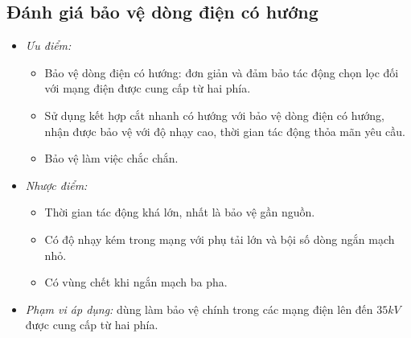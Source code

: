 \documentclass[12pt,a4paper]{article}
\begin{document}
\subsection{Đánh giá bảo vệ dòng điện có hướng}
	\begin{itemize}	
		\item \emph{Ưu điểm:}
		\begin{itemize}
			\item Bảo vệ dòng điện có hướng: đơn giản và đảm bảo tác động chọn lọc đối với mạng điện được cung cấp từ hai phía.
		
			\item Sử dụng kết hợp cắt nhanh có hướng với bảo vệ dòng điện có hướng, nhận được bảo vệ với độ nhạy cao, thời gian tác động thỏa mãn yêu cầu.
		
			\item Bảo vệ làm việc chắc chắn.
		\end{itemize}
		
		\item \emph{Nhược điểm:}
			\begin{itemize}
				\item Thời gian tác động khá lớn, nhất là bảo vệ gần nguồn.
				
				\item Có độ nhạy kém trong mạng với phụ tải lớn và bội số dòng ngắn mạch nhỏ.
				
				\item Có vùng chết khi ngắn mạch ba pha.
			\end{itemize}
		
		\item \emph{Phạm vi áp dụng:} dùng làm bảo vệ chính trong các mạng điện lên đến $35 \unit{kV}$ được cung cấp từ hai phía.
	\end{itemize}
\end{document}
